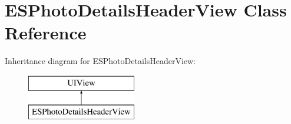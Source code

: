 \hypertarget{interface_e_s_photo_details_header_view}{}\section{E\+S\+Photo\+Details\+Header\+View Class Reference}
\label{interface_e_s_photo_details_header_view}
Inheritance diagram for E\+S\+Photo\+Details\+Header\+View\+:\begin{figure}[H]
\begin{center}
\leavevmode
\includegraphics[height=2.000000cm]{interface_e_s_photo_details_header_view}
\end{center}
\end{figure}

